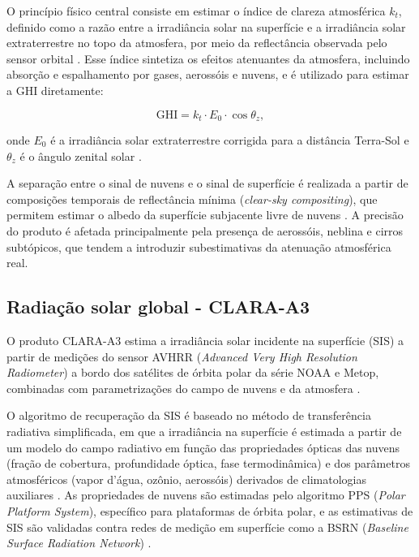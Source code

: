 O princípio físico central consiste em estimar o índice de clareza atmosférica $k_t$, definido como a razão entre a irradiância solar na superfície e a irradiância solar 
extraterrestre no topo da atmosfera, por meio da reflectância observada pelo sensor orbital \citep{pinker1992}. Esse índice sintetiza os efeitos atenuantes da atmosfera, incluindo absorção e espalhamento por gases, aerossóis e nuvens, e é utilizado para estimar a GHI diretamente:

\begin{equation}
    \text{GHI} = k_t \cdot E_0 \cdot \cos\theta_z,
\end{equation}

\noindent onde $E_0$ é a irradiância solar extraterrestre corrigida para a distância Terra-Sol e $\theta_z$ é o ângulo zenital solar \citep{ineichen2016}.

A separação entre o sinal de nuvens e o sinal de superfície é realizada a partir de composições temporais de reflectância mínima (\textit{clear-sky compositing}), que permitem estimar o albedo da superfície subjacente livre de nuvens \citep{frouin2021}. 
A precisão do produto é afetada principalmente pela presença de aerossóis, neblina e cirros subtópicos, que tendem a introduzir subestimativas da atenuação atmosférica real.

\subsection{Radiação solar global - CLARA-A3}

O produto CLARA-A3 estima a irradiância solar incidente na superfície (SIS) a partir de medições do sensor AVHRR (\textit{Advanced Very High Resolution Radiometer}) 
a bordo dos satélites de órbita polar da série NOAA e Metop, combinadas com parametrizações do campo de nuvens e da atmosfera \citep{karlsson2023claraA3}. 

O algoritmo de recuperação da SIS é baseado no método de transferência radiativa simplificada, em que a irradiância na superfície é estimada a partir de um modelo do 
campo radiativo em função das propriedades ópticas das nuvens (fração de cobertura, profundidade óptica, fase termodinâmica) e dos parâmetros atmosféricos (vapor d'água, 
ozônio, aerossóis) derivados de climatologias auxiliares \citep{mueller2012}. As propriedades de nuvens são estimadas pelo algoritmo PPS (\textit{Polar Platform 
System}), específico para plataformas de órbita polar, e as estimativas de SIS são validadas contra redes de medição em superfície como a BSRN (\textit{Baseline Surface Radiation Network}) \citep{karlsson2023claraA3}.

